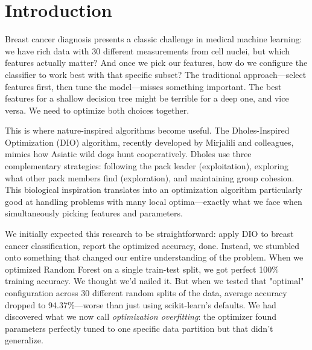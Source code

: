 \documentclass[12pt, a4paper]{article}
\begin{document}
\tableofcontents
\newpage

\begin{center}
\end{center}

\vspace{0.5cm}

\section{Introduction}

Breast cancer diagnosis presents a classic challenge in medical machine learning: we have rich data with 30 different measurements from cell nuclei, but which features actually matter? And once we pick our features, how do we configure the classifier to work best with that specific subset? The traditional approach—select features first, then tune the model—misses something important. The best features for a shallow decision tree might be terrible for a deep one, and vice versa. We need to optimize both choices together.

This is where nature-inspired algorithms become useful. The Dholes-Inspired Optimization (DIO) algorithm, recently developed by Mirjalili and colleagues, mimics how Asiatic wild dogs hunt cooperatively. Dholes use three complementary strategies: following the pack leader (exploitation), exploring what other pack members find (exploration), and maintaining group cohesion. This biological inspiration translates into an optimization algorithm particularly good at handling problems with many local optima—exactly what we face when simultaneously picking features and parameters.

We initially expected this research to be straightforward: apply DIO to breast cancer classification, report the optimized accuracy, done. Instead, we stumbled onto something that changed our entire understanding of the problem. When we optimized Random Forest on a single train-test split, we got perfect 100\% training accuracy. We thought we'd nailed it. But when we tested that "optimal" configuration across 30 different random splits of the data, average accuracy dropped to 94.37\%—worse than just using scikit-learn's defaults. We had discovered what we now call \textit{optimization overfitting}: the optimizer found parameters perfectly tuned to one specific data partition but that didn't generalize.
\end{document}
